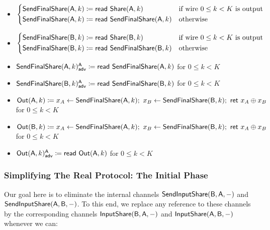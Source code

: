 \begin{itemize}
\item $\begin{cases*} \SendFinalShare(\A,k) \coloneqq \read{\Share(\A,k)} & \text{if wire $0 \leq k < K$ is output} \\ \SendFinalShare(\A,k) \coloneqq \read{\SendFinalShare(\A,k)} & \text{otherwise} \end{cases*}$
\item $\begin{cases*} \SendFinalShare(\B,k) \coloneqq \read{\Share(\B,k)} & \text{if wire $0 \leq k < K$ is output} \\ \SendFinalShare(\B,k) \coloneqq \read{\SendFinalShare(\B,k)} & \text{otherwise} \end{cases*}$
\item {\color{blue} $\mathsf{SendFinalShare}(\mathsf{A},k)^{\mathsf{A}}_{\mathsf{adv}} \coloneqq \mathsf{read} \ \mathsf{SendFinalShare}(\mathsf{A},k)$ for $0 \leq k < K$}
\item {\color{blue} $\mathsf{SendFinalShare}(\mathsf{B},k)^{\mathsf{A}}_{\mathsf{adv}} \coloneqq \mathsf{read} \ \mathsf{SendFinalShare}(\mathsf{B},k)$ for $0 \leq k < K$}
\item $\Out(\A,k) \coloneqq x_A \leftarrow \SendFinalShare(\A,k); \ x_B \leftarrow \SendFinalShare(\B,k); \ \ret{x_A \oplus x_B}$ for $0 \leq k < K$
\item $\Out(\B,k) \coloneqq x_A \leftarrow \SendFinalShare(\A,k); \ x_B \leftarrow \SendFinalShare(\B,k); \ \ret{x_A \oplus x_B}$ for $0 \leq k < K$
\item {\color{blue} $\mathsf{Out}(\mathsf{A},k)^{\mathsf{A}}_{\mathsf{adv}} \coloneqq \mathsf{read} \ \mathsf{Out}(\mathsf{A},k)$ for $0 \leq k < K$}
\end{itemize}

\subsubsection{Simplifying The Real Protocol: The Initial Phase}
Our goal here is to eliminate the internal channels $\mathsf{SendInputShare}(\mathsf{B},\mathsf{A},-)$ and $\mathsf{SendInputShare}(\mathsf{A},\mathsf{B},-)$. To this end, we replace any reference to these channels by the corresponding channels $\mathsf{InputShare}(\mathsf{B},\mathsf{A},-)$ and $\mathsf{InputShare}(\mathsf{A},\mathsf{B},-)$ whenever we can:

